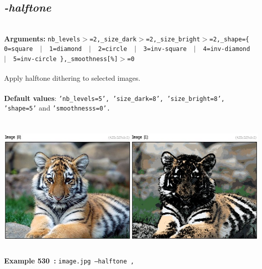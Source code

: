 \documentclass[a4paper,11pt,twoside]{book}
\begin{document}
\subsection{\emph{-halftone} }\vspace*{-0.5em}
~\\\textbf{Arguments: } 
{\small \texttt{nb\_levels$>$=2,\_size\_dark$>$=2,\_size\_bright$>$=2,\_shape=\{ 0=square ~$|$~ 1=diamond ~$|$~ 2=circle ~$|$~ 3=inv-square ~$|$~ 4=inv-diamond ~$|$~ 5=inv-circle \},\_smoothness[\%]$>$=0}}\\~\\
Apply halftone dithering to selected images.
~\\~\\\textbf{Default values}: {\small \texttt{'nb\_levels=5', 'size\_dark=8', 'size\_bright=8', 'shape=5'} and \texttt{'smoothnesss=0'.}}
\begin{center}\includegraphics[keepaspectratio=true,height=7cm,width=\textwidth]{img/gmic_def530.jpg}\\
{\footnotesize \textbf{Example 530~:} \texttt{image.jpg --halftone ,}}
\end{center}
\end{document}

